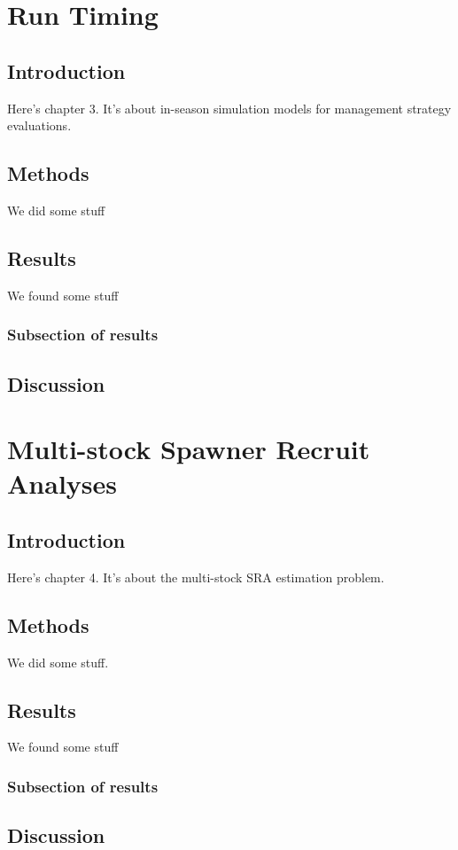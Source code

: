 \documentclass[12pt,]{book}
\theoremstyle{definition}
\theoremstyle{definition}
\theoremstyle{definition}
\theoremstyle{remark}
\begin{document}
\newpage

\chapter{Run Timing}\label{ch3}

\section{Introduction}\label{introduction-1}

Here's chapter 3. It's about in-season simulation models for management
strategy evaluations.

\section{Methods}\label{methods-1}

We did some stuff

\section{Results}\label{results-1}

We found some stuff

\subsection{Subsection of results}\label{subsection-of-results}

\section{Discussion}\label{discussion-1}

\chapter{Multi-stock Spawner Recruit Analyses}\label{ch4}

\section{Introduction}\label{introduction-2}

Here's chapter 4. It's about the multi-stock SRA estimation problem.

\section{Methods}\label{methods-2}

We did some stuff.

\section{Results}\label{results-2}

We found some stuff

\subsection{Subsection of results}\label{subsection-of-results-1}

\section{Discussion}\label{discussion-2}


\end{document}
